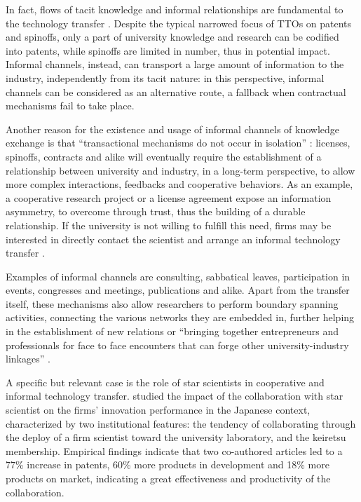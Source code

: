 In fact, flows of tacit knowledge and informal relationships are fundamental to the technology transfer \citep{Geuna2009}. Despite the typical narrowed focus of TTOs on patents and spinoffs, only a part of university knowledge and research can be codified into patents, while spinoffs are limited in number, thus in potential impact. Informal channels, instead, can transport a large amount of information to the industry, independently from its tacit nature: in this perspective, informal channels can be considered as an alternative route, a fallback when contractual mechanisms fail to take place.

Another reason for the existence and usage of informal channels of knowledge exchange is that \enquote{transactional mechanisms do not occur in isolation} \citep{Bercovitz2006}: licenses, spinoffs, contracts and alike will eventually require the establishment of a relationship between university and industry, in a long-term perspective, to allow more complex interactions, feedbacks and cooperative behaviors. As an example, a cooperative research project or a license agreement expose an information asymmetry, to overcome through trust, thus the building of a durable relationship. If the university is not willing to fulfill this need, firms may be interested in directly contact the scientist and arrange an informal technology transfer \citep{Siegel2003a, Link2007}. 

Examples of informal channels are consulting, sabbatical leaves, participation in events, congresses and meetings, publications and alike. Apart from the transfer itself, these mechanisms also allow researchers to perform boundary spanning activities, connecting the various networks they are embedded in, further helping in the establishment of new relations or \enquote{bringing together entrepreneurs and professionals for face to face encounters that can forge other university-industry linkages} \citep{Yusuf2008}.

A specific but relevant case is the role of star scientists in cooperative and informal technology transfer. \citet{Zucker2001} studied the impact of the collaboration with star scientist on the firms' innovation performance in the Japanese context, characterized by two institutional features: the tendency of collaborating through the deploy of a firm scientist toward the university laboratory, and the keiretsu membership. Empirical findings indicate that two co-authored articles led to a 77\% increase in patents, 60\% more products in development and 18\% more products on market, indicating a great effectiveness and productivity of the collaboration.

